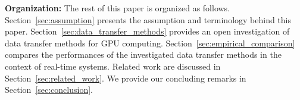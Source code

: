 \textbf{Organization:}
The rest of this paper is organized as follows.
Section~\ref{sec:assumption} presents the assumption and terminology
behind this paper.
Section~\ref{sec:data_transfer_methods} provides an open investigation
of data transfer methods for GPU computing.
Section~\ref{sec:empirical_comparison} compares the performances of the
investigated data transfer methods in the context of real-time systems.
Related work are discussed in Section~\ref{sec:related_work}.
We provide our concluding remarks in Section~\ref{sec:conclusion}.
